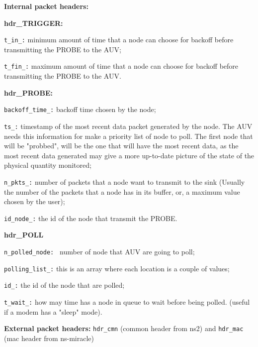 \begin{description}
   \item {\bf Internal packet headers:} 
   	\item{\bf hdr\_TRIGGER:}
   	\begin{description}
		\item {\tt t\_in\_:} minimum amount of time that a node can choose for backoff before transmitting the PROBE to the AUV;
		\item {\tt t\_fin\_:} maximum amount of time that a node can choose for backoff before transmitting the PROBE to the AUV. 
	\end{description}
	\item{\bf hdr\_PROBE:}
	\begin{description}
		\item{\tt backoff\_time\_:} backoff time chosen by the node;
		\item{\tt ts\_:} timestamp of the most recent data packet generated by the node. The AUV needs this information for make a priority list of node to poll. The first node that will be "probbed", will be the one that will have the most recent data, as the most recent data generated may give a more up-to-date picture of the state of the physical quantity monitored;
		\item{\tt n\_pkts\_:} number of packets that a node want to transmit to the sink (Usually the number of the packets that a node has in its buffer, or, a maximum value chosen by the user);
		\item{\tt id\_node\_:} the id of the node that transmit the PROBE. 
	\end{description}
	\item{\bf hdr\_POLL}
	\begin{description}
		\item {\tt n\_polled\_node: } number of node that AUV are going to poll;
		\item {\tt polling\_list\_:} this is an array where each location is a couple of values;
		\begin {description}
			\item {\tt id\_:} the id of the node that are polled;
			\item {\tt t\_wait\_:} how may time has a node in queue to wait before being polled. (useful if a modem has a "sleep" mode).
		\end{description}
	\end{description}
   \item {\bf External packet headers:} {\tt hdr\_cmn} (common header from ns2) and  {\tt hdr\_mac} (mac header from ns-miracle) 

\end{description}

